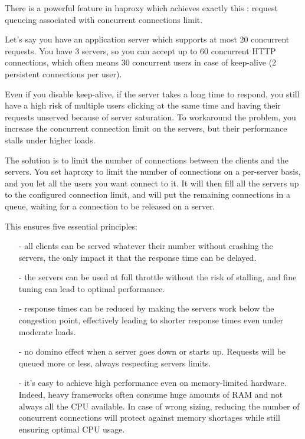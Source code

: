 There is a powerful feature in haproxy which achieves exactly this : request
queueing associated with concurrent connections limit.

Let's say you have an application server which supports at most 20 concurrent
requests. You have 3 servers, so you can accept up to 60 concurrent HTTP
connections, which often means 30 concurrent users in case of keep-alive (2
persistent connections per user).

Even if you disable keep-alive, if the server takes a long time to respond,
you still have a high risk of multiple users clicking at the same time and
having their requests unserved because of server saturation. To workaround
the problem, you increase the concurrent connection limit on the servers,
but their performance stalls under higher loads.

The solution is to limit the number of connections between the clients and the
servers. You set haproxy to limit the number of connections on a per-server
basis, and you let all the users you want connect to it. It will then fill all
the servers up to the configured connection limit, and will put the remaining
connections in a queue, waiting for a connection to be released on a server.

This ensures five essential principles:

\begin{itemize}
\item[-] all clients can be served whatever their number without crashing the
    servers, the only impact it that the response time can be delayed.

\item[-] the servers can be used at full throttle without the risk of stalling,
    and fine tuning can lead to optimal performance.

\item[-] response times can be reduced by making the servers work below the
    congestion point, effectively leading to shorter response times even
    under moderate loads.

\item[-] no domino effect when a server goes down or starts up. Requests will be
    queued more or less, always respecting servers limits.

\item[-] it's easy to achieve high performance even on memory-limited hardware.
    Indeed, heavy frameworks often consume huge amounts of RAM and not always
    all the CPU available. In case of wrong sizing, reducing the number of
    concurrent connections will protect against memory shortages while still
    ensuring optimal CPU usage.
\end{itemize}

